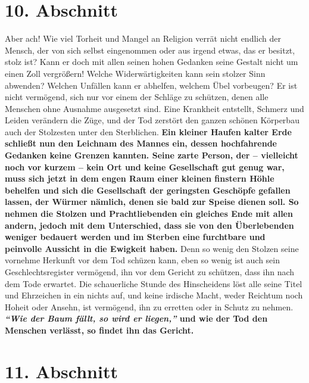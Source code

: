 \section{10. Abschnitt} \label{kap12_ab10}

Aber ach! Wie viel Torheit und Mangel an Religion verrät nicht endlich der
Mensch, der von sich selbst eingenommen oder aus irgend etwas, das er besitzt,
stolz ist? Kann er doch mit allen seinen hohen Gedanken seine Gestalt nicht um
einen Zoll vergrößern! Welche Widerwärtigkeiten kann sein stolzer Sinn abwenden?
Welchen Unfällen kann er abhelfen, welchem Übel vorbeugen? Er ist nicht
vermögend, sich nur vor einem der Schläge zu schützen, denen alle Menschen ohne
Ausnahme ausgesetzt sind.
Eine Krankheit entstellt,
Schmerz und Leiden
verändern die Züge, und der Tod zerstört den ganzen schönen Körperbau auch der
Stolzesten unter den Sterblichen. \textbf{Ein kleiner Haufen kalter Erde
schließt nun
den Leichnam des Mannes ein, dessen hochfahrende Gedanken keine Grenzen kannten.
Seine zarte Person, der -- vielleicht noch vor kurzem -- kein Ort und keine
Gesellschaft gut genug war, muss sich jetzt in dem engen Raum einer kleinen
finstern Höhle behelfen und sich die Gesellschaft der geringsten Geschöpfe
gefallen lassen, der Würmer nämlich, denen sie bald zur Speise dienen soll. So
nehmen die Stolzen und Prachtliebenden ein gleiches Ende mit allen andern,
jedoch mit dem Unterschied, dass sie von den Überlebenden weniger
bedauert
werden und im Sterben eine furchtbare und peinvolle Aussicht in die Ewigkeit
haben.} Denn so wenig den Stolzen seine vornehme Herkunft vor dem Tod schüzen
kann, eben so wenig ist auch sein Geschlechtsregister vermögend, ihn vor dem
Gericht zu schützen, dass ihn nach dem Tode erwartet. Die schauerliche Stunde
des Hinscheidens löst alle seine Titel und Ehrzeichen in ein nichts auf, und
keine irdische Macht, weder Reichtum noch Hoheit oder Ansehn, ist vermögend,
ihn zu erretten oder in Schutz zu nehmen. \textbf{\textit{"`Wie der Baum fällt,
so wird er
liegen,"'} und wie der Tod den Menschen verlässt, so findet ihn das Gericht.}

\section{11. Abschnitt} \label{kap12_ab11}

